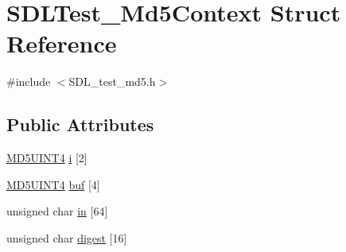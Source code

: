 \hypertarget{struct_s_d_l_test___md5_context}{\section{S\-D\-L\-Test\-\_\-\-Md5\-Context Struct Reference}
\label{struct_s_d_l_test___md5_context}
}


{\ttfamily \#include $<$S\-D\-L\-\_\-test\-\_\-md5.\-h$>$}

\subsection*{Public Attributes}
\begin{DoxyCompactItemize}
\item 
\hyperlink{_s_d_l__test__md5_8h_a2bdcfd1b3373be8191c70eb4a7cb84c6}{M\-D5\-U\-I\-N\-T4} \hyperlink{struct_s_d_l_test___md5_context_a95b3d5fd74fd1b7a27bf96f3bb32beb4}{i} \mbox{[}2\mbox{]}
\item 
\hyperlink{_s_d_l__test__md5_8h_a2bdcfd1b3373be8191c70eb4a7cb84c6}{M\-D5\-U\-I\-N\-T4} \hyperlink{struct_s_d_l_test___md5_context_a061f0cead7ec49ac4c5baf0bbd9c13a7}{buf} \mbox{[}4\mbox{]}
\item 
unsigned char \hyperlink{struct_s_d_l_test___md5_context_a337638ef799dc0ad9397ea9b175ea388}{in} \mbox{[}64\mbox{]}
\item 
unsigned char \hyperlink{struct_s_d_l_test___md5_context_ab29079997a9f35e5d52c2aac3ad28f90}{digest} \mbox{[}16\mbox{]}
\end{DoxyCompactItemize}


